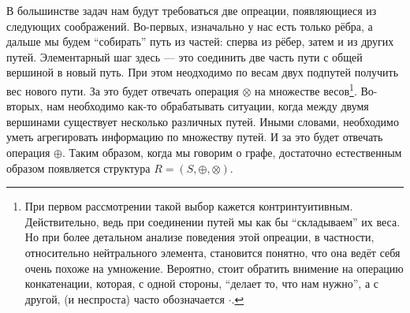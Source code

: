 В большинстве задач нам будут требоваться две опреации, появляющиеся из следующих соображений. Во-первых, изначально у нас есть только рёбра, а дальше мы будем ``собирать'' путь из частей: сперва из рёбер, затем и из других путей. Элементарный шаг здесь --- это соединить две часть пути с общей вершиной в новый путь. При этом неодходимо по весам двух подпутей получить вес нового пути. За это будет отвечать операция $\otimes$ на множестве весов\footnote{При первом рассмотрении такой выбор кажется контринтуитивным. Действительно, ведь при соединении путей мы как бы ``складываем'' их веса. Но при более детальном анализе поведения этой опреации, в частности, относительно нейтрального элемента, становится понятно, что она ведёт себя очень похоже на умножение. Вероятно, стоит обратить внимение на операцию конкатенации, которая, с одной стороны, ``делает то, что нам нужно'', а с другой, (и неспроста) часто обозначается $\cdot$.}. Во-вторых, нам необходимо как-то обрабатывать ситуации, когда между двумя вершинами существует несколько различных путей. Иными словами, необходимо уметь агрегировать информацию по множеству путей. И за это будет отвечать операция $\oplus$. Таким образом, когда мы говорим о графе, достаточно естественным образом появляется структура $R=(S,\oplus,\otimes)$.


